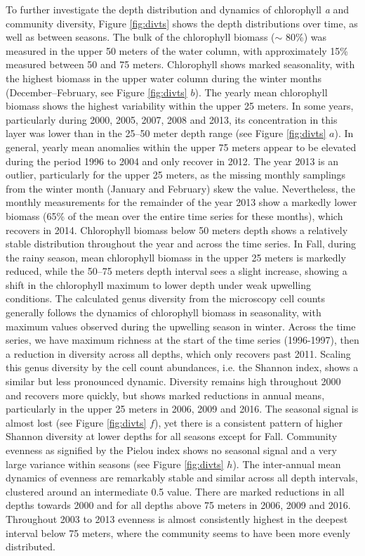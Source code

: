 \documentclass[draft]{agujournal2019}
\begin{document}
To further investigate the depth distribution and dynamics of chlorophyll \textit{a} and community diversity, Figure \ref{fig:divts} shows the depth distributions over time, as well as between seasons. The bulk of the chlorophyll biomass ($\sim$ 80\%) was measured in the upper 50 meters of the water column, with approximately 15\% measured between 50 and 75 meters. Chlorophyll shows marked seasonality, with the highest biomass in the upper water column during the winter months (December–February, see Figure \ref{fig:divts} $b$). The yearly mean chlorophyll biomass shows the highest variability within the upper 25 meters. In some years, particularly during 2000, 2005, 2007, 2008 and 2013, its concentration in this layer was lower than in the 25–50 meter depth range (see Figure \ref{fig:divts} $a$). In general, yearly mean anomalies within the upper 75 meters appear to be elevated during the period 1996 to 2004 and only recover in 2012. The year 2013 is an outlier, particularly for the upper 25 meters, as the missing monthly samplings from the winter month (January and February) skew the value. Nevertheless, the monthly measurements for the remainder of the year 2013 show a markedly lower biomass (65\% of the mean over the entire time series for these months), which recovers in 2014. Chlorophyll biomass below 50 meters depth shows a relatively stable distribution throughout the year and across the time series. In Fall, during the rainy season, mean chlorophyll biomass in the upper 25 meters is markedly reduced, while the 50–75 meters depth interval sees a slight increase, showing a shift in the chlorophyll maximum to lower depth under weak upwelling conditions.
The calculated genus diversity from the microscopy cell counts generally follows the dynamics of chlorophyll biomass in seasonality, with maximum values observed during the upwelling season in winter. Across the time series, we have maximum richness at the start of the time series (1996-1997), then a reduction in diversity across all depths, which only recovers past 2011. Scaling this genus diversity by the cell count abundances, i.e. the Shannon index, shows a similar but less pronounced dynamic. Diversity remains high throughout 2000 and recovers more quickly, but shows marked reductions in annual means, particularly in the upper 25 meters in 2006, 2009 and 2016. The seasonal signal is almost lost (see Figure \ref{fig:divts} $f$), yet there is a consistent pattern of higher Shannon diversity at lower depths for all seasons except for Fall. 
Community evenness as signified by the Pielou index shows no seasonal signal and a very large variance within seasons (see Figure \ref{fig:divts} $h$). The inter-annual mean dynamics of evenness are remarkably stable and similar across all depth intervals, clustered around an intermediate 0.5 value. There are marked reductions in all depths towards 2000 and for all depths above 75 meters in 2006, 2009 and 2016. Throughout 2003 to 2013 evenness is almost consistently highest in the deepest interval below 75 meters, where the community seems to have been more evenly distributed. 
\end{document}
